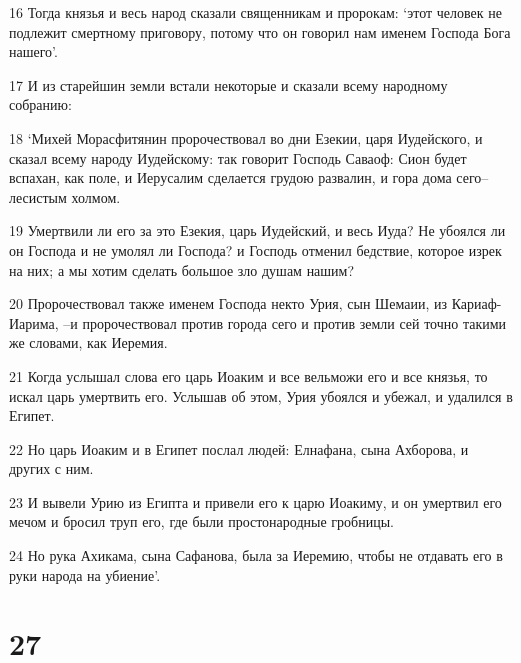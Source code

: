 \par 16 Тогда князья и весь народ сказали священникам и пророкам: `этот человек не подлежит смертному приговору, потому что он говорил нам именем Господа Бога нашего'.
\par 17 И из старейшин земли встали некоторые и сказали всему народному собранию:
\par 18 `Михей Морасфитянин пророчествовал во дни Езекии, царя Иудейского, и сказал всему народу Иудейскому: так говорит Господь Саваоф: Сион будет вспахан, как поле, и Иерусалим сделается грудою развалин, и гора дома сего--лесистым холмом.
\par 19 Умертвили ли его за это Езекия, царь Иудейский, и весь Иуда? Не убоялся ли он Господа и не умолял ли Господа? и Господь отменил бедствие, которое изрек на них; а мы хотим сделать большое зло душам нашим?
\par 20 Пророчествовал также именем Господа некто Урия, сын Шемаии, из Кариаф-Иарима, --и пророчествовал против города сего и против земли сей точно такими же словами, как Иеремия.
\par 21 Когда услышал слова его царь Иоаким и все вельможи его и все князья, то искал царь умертвить его. Услышав об этом, Урия убоялся и убежал, и удалился в Египет.
\par 22 Но царь Иоаким и в Египет послал людей: Елнафана, сына Ахборова, и других с ним.
\par 23 И вывели Урию из Египта и привели его к царю Иоакиму, и он умертвил его мечом и бросил труп его, где были простонародные гробницы.
\par 24 Но рука Ахикама, сына Сафанова, была за Иеремию, чтобы не отдавать его в руки народа на убиение'.

\chapter{27}

